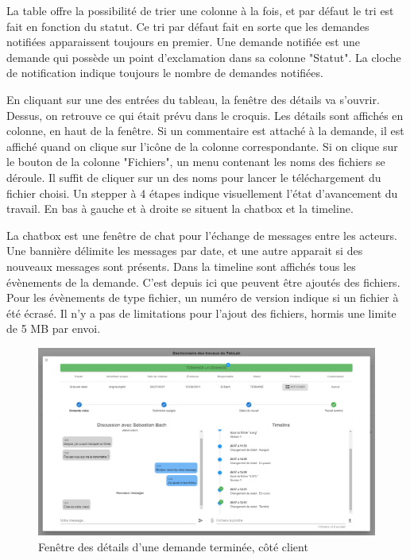 \documentclass[
    iai, %
    eai, %
]{heig-tb}
\begin{document}
La table offre la possibilité de trier une colonne à la fois, et par défaut le tri est fait en fonction du statut.
Ce tri par défaut fait en sorte que les demandes notifiées apparaissent toujours en premier. Une demande notifiée est une demande qui possède un point d'exclamation dans sa colonne "Statut".
La cloche de notification indique toujours le nombre de demandes notifiées.

En cliquant sur une des entrées du tableau, la fenêtre des détails va s'ouvrir. Dessus, on retrouve ce qui était prévu dans le croquis. Les détails sont affichés en colonne, en haut de la fenêtre.
Si un commentaire est attaché à la demande, il est affiché quand on clique sur l'icône de la colonne correspondante. Si on clique sur le bouton de la colonne "Fichiers", un menu contenant les noms des fichiers se déroule. Il suffit de cliquer sur un des noms pour lancer le téléchargement du fichier choisi.
Un stepper à 4 étapes indique visuellement l'état d'avancement du travail. En bas à gauche et à droite se situent la chatbox et la timeline.

La chatbox est une fenêtre de chat pour l'échange de messages entre les acteurs. Une bannière délimite les messages par date, et une autre apparait si des nouveaux messages sont présents.
Dans la timeline sont affichés tous les évènements de la demande. C'est depuis ici que peuvent être ajoutés des fichiers. Pour les évènements de type fichier, un numéro de version indique si un fichier à été écrasé. Il n'y a pas de limitations pour l'ajout des fichiers, hormis une limite de 5 MB par envoi.

\begin{figure}[h]
  \includegraphics[width=14cm]{ui_jobinfo_client2.PNG}
  \caption{Fenêtre des détails d'une demande terminée, côté client}
\end{figure}
\end{document}
